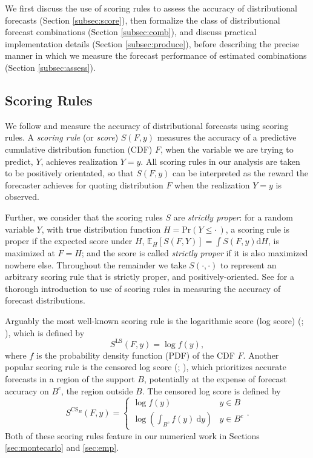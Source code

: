 \documentclass[12pt]{article}
\theoremstyle{definition}
\theoremstyle{remark}
\begin{document}
{We first discuss {the use of scoring rules to} assess the accuracy of distributional forecasts (Section \ref{subsec:score}), then formalize the class of distributional forecast combinations (Section \ref{subsec:comb}), and discuss practical implementation details (Section \ref{subsec:produce}), before describing the precise manner in which we measure the forecast performance of estimated combinations (Section \ref{subsec:assess}).

\subsection{Scoring Rules\label{subsec:score}}

We follow \cite{Gneiting2007} and measure the accuracy of distributional forecasts using scoring rules. A \textit{scoring rule} (or \textit{score}) $S(F,y)$ measures the accuracy of a predictive cumulative distribution function (CDF) $F$, when the variable we are trying to predict, $Y$, achieves realization $Y=y$. All scoring rules in our analysis are taken to be positively orientated, so that $S(F,y)$ can be interpreted as the reward the forecaster achieves for quoting distribution $F$ when the realization $Y=y$ is observed.

Further, we consider that the scoring rules $S$ are \textit{strictly proper}: for a random variable $Y$, with true distribution function $H=\mathrm{Pr}(Y \leq \cdot \,)$, a scoring rule is proper if the expected score under $H$, $\mathbb{E}_{H}[S(F, Y)]=\int S(F,y)\mathrm{d}H$, is maximized at $F=H$; and the score is called \textit{strictly proper} if it is also maximized nowhere else. Throughout the remainder we take $S(\cdot,\cdot)$ to represent an arbitrary scoring rule that is strictly proper, and positively-oriented. See \cite{Gneiting2007} for a thorough introduction to use of scoring rules in measuring the accuracy of forecast distributions.

Arguably the most well-known scoring rule is the logarithmic score (log score) (\citealp{Hall2007}; \citealp{Geweke2011}), which is defined by 
\begin{equation}
S^{\mathrm{LS}}(F,y) = \log f(y),  \label{eqn:simsl}
\end{equation}
where $f$ is the probability density function (PDF) of the CDF $F$. Another popular scoring rule is the censored log score (\citealp{Diks2011}; \citealp{Opschoor2017}), which prioritizes accurate forecasts in a region of the support $B$, potentially at the expense of forecast accuracy on $B^c$, the region outside $B$. The censored log score is defined by 
\begin{equation}
S^{\mathrm{CS}_B}(F, y) = 
\begin{cases}
\log f(y) & y \in B \\ 
\log \left( \int_{B^c} f(y)\ \mathrm{d}y \right) & y \in B^c
\end{cases}.  \label{eqn:simscls}
\end{equation}
Both of these scoring rules feature in our numerical work in Sections \ref{sec:montecarlo} and \ref{sec:emp}.

}
\end{document}
